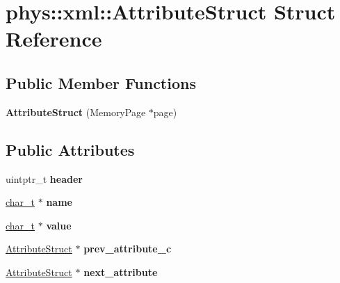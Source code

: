 \hypertarget{structphys_1_1xml_1_1AttributeStruct}{
\section{phys::xml::AttributeStruct Struct Reference}
\label{dd/dfe/structphys_1_1xml_1_1AttributeStruct}
}
\subsection*{Public Member Functions}
\begin{DoxyCompactItemize}
\item 
\hypertarget{structphys_1_1xml_1_1AttributeStruct_ae56b37b04de2de9b06f2ab62063860d0}{
{\bfseries AttributeStruct} (MemoryPage $\ast$page)}
\label{dd/dfe/structphys_1_1xml_1_1AttributeStruct_ae56b37b04de2de9b06f2ab62063860d0}

\end{DoxyCompactItemize}
\subsection*{Public Attributes}
\begin{DoxyCompactItemize}
\item 
\hypertarget{structphys_1_1xml_1_1AttributeStruct_a9fd6577532fd75614cbbeef25ebc483d}{
uintptr\_\-t {\bfseries header}}
\label{dd/dfe/structphys_1_1xml_1_1AttributeStruct_a9fd6577532fd75614cbbeef25ebc483d}

\item 
\hypertarget{structphys_1_1xml_1_1AttributeStruct_a4063a57165ab503f269e785f2606afbf}{
\hyperlink{namespacephys_1_1xml_afc87705cd1c2917d87b879715a2d8f6e}{char\_\-t} $\ast$ {\bfseries name}}
\label{dd/dfe/structphys_1_1xml_1_1AttributeStruct_a4063a57165ab503f269e785f2606afbf}

\item 
\hypertarget{structphys_1_1xml_1_1AttributeStruct_a4ef17ff97e13877dd8cf22eac20b3e08}{
\hyperlink{namespacephys_1_1xml_afc87705cd1c2917d87b879715a2d8f6e}{char\_\-t} $\ast$ {\bfseries value}}
\label{dd/dfe/structphys_1_1xml_1_1AttributeStruct_a4ef17ff97e13877dd8cf22eac20b3e08}

\item 
\hypertarget{structphys_1_1xml_1_1AttributeStruct_ad37be3bf8c8d5a469396e882af402f89}{
\hyperlink{structphys_1_1xml_1_1AttributeStruct}{AttributeStruct} $\ast$ {\bfseries prev\_\-attribute\_\-c}}
\label{dd/dfe/structphys_1_1xml_1_1AttributeStruct_ad37be3bf8c8d5a469396e882af402f89}

\item 
\hypertarget{structphys_1_1xml_1_1AttributeStruct_a647e4114bd818b0f88acff5c18746b0f}{
\hyperlink{structphys_1_1xml_1_1AttributeStruct}{AttributeStruct} $\ast$ {\bfseries next\_\-attribute}}
\label{dd/dfe/structphys_1_1xml_1_1AttributeStruct_a647e4114bd818b0f88acff5c18746b0f}

\end{DoxyCompactItemize}


